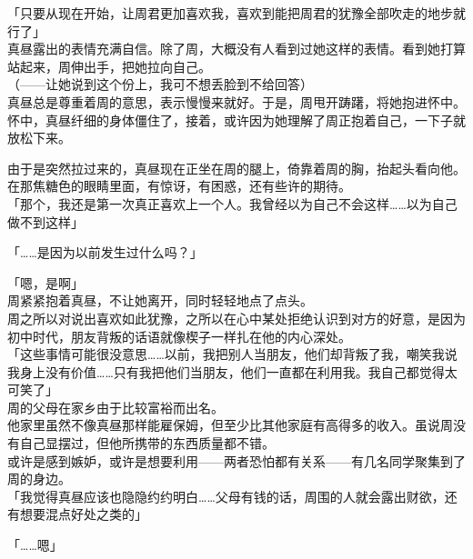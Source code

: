 「只要从现在开始，让周君更加喜欢我，喜欢到能把周君的犹豫全部吹走的地步就行了」\\

真昼露出的表情充满自信。除了周，大概没有人看到过她这样的表情。看到她打算站起来，周伸出手，把她拉向自己。\\

（——让她说到这个份上，我可不想丢脸到不给回答）\\

真昼总是尊重着周的意思，表示慢慢来就好。于是，周甩开踌躇，将她抱进怀中。\\

怀中，真昼纤细的身体僵住了，接着，或许因为她理解了周正抱着自己，一下子就放松下来。

由于是突然拉过来的，真昼现在正坐在周的腿上，倚靠着周的胸，抬起头看向他。\\

在那焦糖色的眼睛里面，有惊讶，有困惑，还有些许的期待。\\

「那个，我还是第一次真正喜欢上一个人。我曾经以为自己不会这样……以为自己做不到这样」

「……是因为以前发生过什么吗？」

「嗯，是啊」\\

周紧紧抱着真昼，不让她离开，同时轻轻地点了点头。\\

周之所以对说出喜欢如此犹豫，之所以在心中某处拒绝认识到对方的好意，是因为初中时代，朋友背叛的话语就像楔子一样扎在他的内心深处。\\

「这些事情可能很没意思……以前，我把别人当朋友，他们却背叛了我，嘲笑我说我身上没有价值……只有我把他们当朋友，他们一直都在利用我。我自己都觉得太可笑了」\\

周的父母在家乡由于比较富裕而出名。\\

他家里虽然不像真昼那样能雇保姆，但至少比其他家庭有高得多的收入。虽说周没有自己显摆过，但他所携带的东西质量都不错。\\

或许是感到嫉妒，或许是想要利用——两者恐怕都有关系——有几名同学聚集到了周的身边。\\

「我觉得真昼应该也隐隐约约明白……父母有钱的话，周围的人就会露出财欲，还有想要混点好处之类的」

「……嗯」\\

